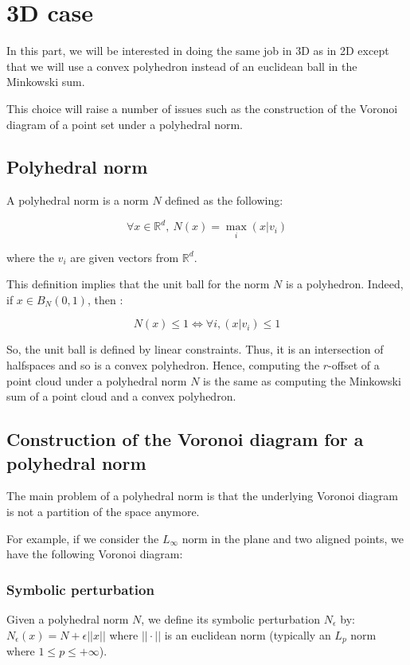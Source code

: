 \chapter{3D case}

In this part, we will be interested in doing the same job in 3D as in 2D except
that we will use a convex polyhedron instead of an euclidean ball in the
Minkowski sum.

This choice will raise a number of issues such as the construction of the
Voronoi diagram of a point set under a polyhedral norm.

\section{Polyhedral norm}
A polyhedral norm is a norm $ N $ defined as the following:

$$ \forall x \in \mathbb{R}^d,~ N(x) = \max_{i} (x | v_i) $$

where the $ v_i $ are given vectors from $ \mathbb{R}^d $.

This definition implies that the unit ball for the norm $ N $ is a polyhedron.
Indeed, if $ x \in B_N(0, 1) $, then :

$$ N(x) \leq 1 \Longleftrightarrow \forall i, (x | v_i) \leq 1 $$

So, the unit ball is defined by linear constraints. Thus, it is an intersection
of halfspaces and so is a convex polyhedron. Hence, computing the $ r $-offset
of a point cloud under a polyhedral norm $ N $ is the same as computing the
Minkowski sum of a point cloud and a convex polyhedron.

\section{Construction of the Voronoi diagram for a polyhedral norm}

The main problem of a polyhedral norm is that the underlying Voronoi diagram is
not a partition of the space anymore.

For example, if we consider the $ L_\infty $ norm in the plane and two aligned
points, we have the following Voronoi diagram:


\subsection{Symbolic perturbation}

Given a polyhedral norm $ N $, we define its symbolic perturbation $ N_\epsilon
$ by: $ N_\epsilon (x) = N + \epsilon || x || $ where $ || \cdot || $ is an
euclidean norm (typically an $ L_p $ norm where $ 1 \leq p \leq +\infty $).

